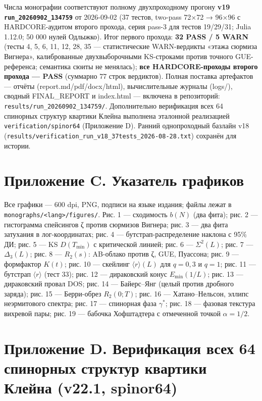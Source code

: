 \documentclass[
]{article}
\begin{document}
Числа монографии соответствуют полному двухпроходному прогону
\textbf{v19 \texttt{run\_20260902\_134759}} от 2026-09-02 (37 тестов,
two-pass 72×72 → 96×96 с HARDCORE-аудитом второго прохода, серия pass-3
для тестов 19/29/31; Julia 1.12.0; 50 000 нулей Одлыжко). Итог первого
прохода: \textbf{32 PASS / 5 WARN} (тесты 4, 5, 6, 11, 12, 28, 35 ---
статистические WARN-вердикты «этажа сюрмиза Вигнера», калиброванные
двухвыборочными KS-строками против точного GUE-референса; семантика
сюиты не менялась); \textbf{все HARDCORE-проходы второго прохода ---
PASS} (суммарно 77 строк вердиктов). Полная поставка артефактов ---
отчёты (report.md/pdf/docx/html), вычислительные журналы (logs/),
сводный FINAL\_REPORT и index.html --- включена в репозиторий:
\texttt{results/run\_20260902\_134759/}. Дополнительно верификация всех
64 спинорных структур квартики Клейна выполнена эталонной реализацией
\texttt{verification/spinor64} (Приложение D). Ранний однопроходный
базлайн v18
(\texttt{results/verification\_run\_v18\_37tests\_2026-08-28.txt})
сохранён для истории.

\section{Приложение C. Указатель
графиков}\label{ux43fux440ux438ux43bux43eux436ux435ux43dux438ux435-c.-ux443ux43aux430ux437ux430ux442ux435ux43bux44c-ux433ux440ux430ux444ux438ux43aux43eux432}

Все графики --- 600 dpi, PNG, подписи на языке издания; файлы лежат в
\texttt{monographs/\textless{}lang\textgreater{}/figures/}. Рис. 1 ---
сходимость \(b(N)\) (два фита); рис. 2 --- гистограмма спейсингов ζ
против сюрмизов Вигнера; рис. 3 --- два фита затухания в
лог-координатах; рис. 4 --- бутстрап-распределение наклона с 95\% ДИ;
рис. 5 --- KS \(D(T_{\min})\) с критической линией; рис. 6 ---
\(\Sigma^2(L)\); рис. 7 --- \(\Delta_3(L)\); рис. 8 --- \(R_2(s)\):
AB-облако против ζ, GUE, Пуассона; рис. 9 --- формфактор \(K(t)\); рис.
10 --- скейлинг \(\langle r\rangle(L)\) для \(q=0{,}3\) и \(q=1\); рис.
11 --- бутстрап \(\langle r\rangle\) (тест 33); рис. 12 --- дираковский
конус \(E_{\min}(1/L)\); рис. 13 --- дираковский провал DOS; рис. 14 ---
Байерс--Янг (целый против дробного заряда); рис. 15 --- Берри-обрез
\(R_2(0;T)\); рис. 16 --- Хатано--Нельсон, эллипс неэрмитового спектра;
рис. 17 --- спинорная фаза \(\gamma^{\ast}\); рис. 18 --- фазовая
текстура вихревой пары; рис. 19 --- бабочка Хофштадтера с отмеченной
точкой \(\alpha=1/2\).

\section{Приложение D. Верификация всех 64 спинорных структур квартики
Клейна (v22.1,
spinor64)}\label{ux43fux440ux438ux43bux43eux436ux435ux43dux438ux435-d.-ux432ux435ux440ux438ux444ux438ux43aux430ux446ux438ux44f-ux432ux441ux435ux445-64-ux441ux43fux438ux43dux43eux440ux43dux44bux445-ux441ux442ux440ux443ux43aux442ux443ux440-ux43aux432ux430ux440ux442ux438ux43aux438-ux43aux43bux435ux439ux43dux430-v22.1-spinor64}
\end{document}
